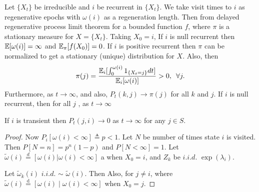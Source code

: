 \documentclass[all-lectures.tex]{subfiles}
\begin{document}
Let $\{X_t\}$ be irreducible and $i$ be recurrent in $\{X_t\}$. We take visit times to $i$ as regenerative epochs with $\omega(i)$ as a regeneration length. Then from delayed regenerative process limit theorem for a bounded function $f$,
where $\pi$ is a stationary measure for $X = \{X_t\}$. Taking $X_0 = i$,
If $i$ is null recurrent then $\mathbb{E}[\omega(i)] = \infty$ and $\mathbb{E}_{\pi}[f(X_0)] = 0$. If $i$ is positive recurrent then $\pi$ can be normalized to get a stationary (unique) distribution for $X$. Also, then
\begin{align}
\label{eq17-1}
\pi(j) = \frac{\mathbb{E}_i[\int_{0}^{\omega(i)} 1_{\{X_t=j\}} dt]}{\mathbb{E}_i[\omega(i)]} >0, \enskip \forall j.
\end{align}
Furthermore, as $t \to \infty$,
and also, $P_t(k,j) \to \pi(j)$ for all $k$ and $j$.
If $i$ is null recurrent, then for all $j$ , as $t \to \infty$
\begin{prop}
If $i$ is transient then $P_t(j,i) \to 0$ as $t \to \infty$ for any $j \in S$.
\end{prop}
\begin{proof}
Now $P_i[\omega(i) < \infty] \triangleq p <1$. Let $N$ be number of times state $i$ is visited. Then $P[N=n] = p^n (1-p)$ and $P[N<\infty]=1$. Let $\tilde{\omega}(i) \stackrel{d}{=} [\omega(i) | \omega(i) < \infty]$ a when $X_0=i$, and $Z_k$ be $i.i.d.$ $\exp(\lambda_{i})$.

Let $\tilde{\omega}_k(i)$ $i.i.d.$ $\sim$ $\tilde{\omega}(i)$.
Then
Also, for $j \neq i$,
where $\tilde{\omega}(i) \stackrel{\text{d}}{=} [\omega(i) \mid \omega(i) < \infty]$ when $X_0 = j$.
\end{proof}
\end{document}

